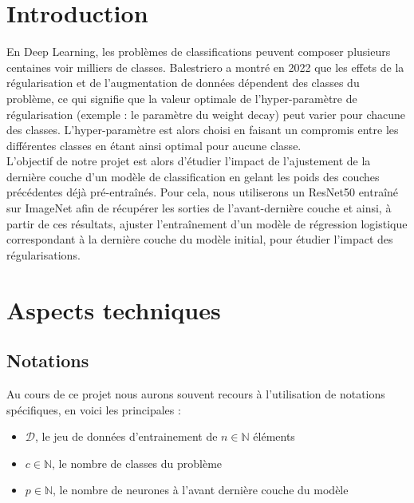 \documentclass[12pt,english, openany]{book}
\begin{document}
\mainmatter

\chapter{Introduction}

En Deep Learning, les problèmes de classifications peuvent composer plusieurs centaines voir milliers de classes. Balestriero a montré en 2022 \cite{balestriero2022effects} que les effets de la régularisation et de l'augmentation de données dépendent des classes du problème, ce qui signifie que la valeur optimale de l'hyper-paramètre de régularisation (exemple : le paramètre du weight decay) peut varier pour chacune des classes. L'hyper-paramètre est alors choisi en faisant un compromis entre les différentes classes en étant ainsi optimal pour aucune classe. \\

L'objectif de notre projet est alors d'étudier l'impact de l'ajustement de la dernière couche d'un modèle de classification en gelant les poids des couches précédentes déjà pré-entraînés. Pour cela, nous utiliserons un ResNet50 entraîné sur ImageNet afin de récupérer les sorties de l'avant-dernière couche et ainsi, à partir de ces résultats, ajuster l'entraînement d'un modèle de régression logistique correspondant à la dernière couche du modèle initial, pour étudier l'impact des régularisations.


\chapter{Aspects techniques}

\section{Notations}

Au cours de ce projet nous aurons souvent recours à l'utilisation de notations spécifiques, en voici les principales : 

\begin{itemize}
	\item $\mathcal{D}$, le jeu de données d'entrainement de $n \in \mathbb{N}$ éléments
	\item $c \in \mathbb{N}$, le nombre de classes du problème
    \item $p \in \mathbb{N}$, le nombre de neurones à l'avant dernière couche du modèle

\end{itemize}
\end{document}
